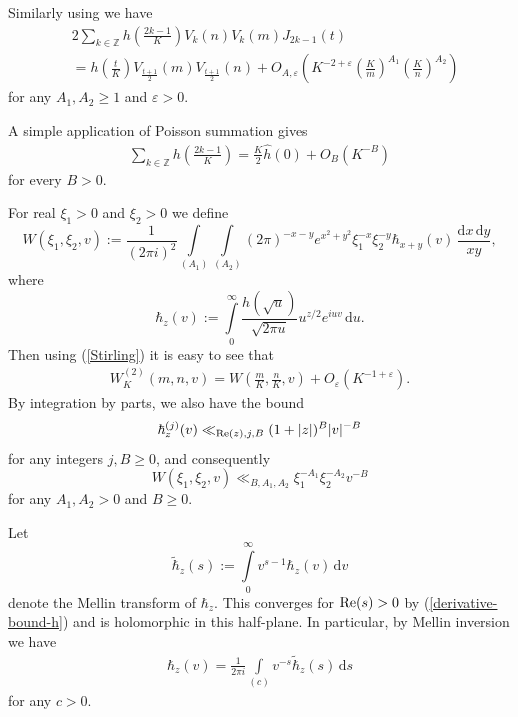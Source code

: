 \documentclass[a4paper,10pt,twoside]{amsart}
\theoremstyle{definition}
\numberwithin{equation}{section}
\newcommand\Z{\mathbb{Z}}
\newcommand\eps{\varepsilon}
\renewcommand{\Re}{\textnormal{Re}}
\renewcommand\:{\colon}
\begin{document}
Similarly using \cite[Lemma 5.8.]{Iwaniec1997} we have 
\begin{align}\label{J-Bessel-avg-III}
&2\sum_{k\in\Z} h\left(\frac{2k-1}K\right)V_k(n)V_k(m)J_{2k-1}(t) \nonumber \\
&=h\left(\frac tK\right)V_{\frac{t+1}2}(m)V_{\frac{t+1}2}(n)+O_{A,\eps}\left(K^{-2+\eps}\left(\frac Km\right)^{A_1}\left(\frac Kn\right)^{A_2}\right)
\end{align}
for any $A_1,A_2\geq 1$ and $\eps>0$.

A simple application of Poisson summation gives
\begin{align}\label{simple-Poisson}
\sum_{k\in\Z}h\left(\frac{2k-1}K\right)=\frac K2\widehat h(0)+O_B(K^{-B})
\end{align}
for every $B>0$. 

For real $\xi_1>0$ and $\xi_2>0$ we define
\[W(\xi_1,\xi_2,v):=\frac1{(2\pi i)^2}\int\limits_{(A_1)}\int\limits_{(A_2)}(2\pi )^{-x-y}e^{x^2+y^2}\xi_1^{-x}\xi_2^{-y}\hbar_{x+y}(v)\,\frac{\mathrm d x\,\mathrm d y}{xy},\]
where 
\[
\hbar_z(v):=\int\limits_0^\infty \frac{h(\sqrt u)}{\sqrt{2\pi u}}u^{z/2}e^{iuv}\,\mathrm d u. 
\]
Then using (\ref{Stirling}) it is easy to see that
\begin{align}\label{new-weight-function}
W_K^{(2)}(m,n,v)=W\left(\frac mK,\frac nK,v\right)+O_\eps\left(K^{-1+\varepsilon}\right). 
\end{align}
By integration by parts, we also have the bound
\begin{align}\label{derivative-bound-h}
\hbar_z^{(j)}(v)\ll_{\Re(z),j,B}(1+|z|)^B|v|^{-B}
\end{align}
for any integers $j,B\geq 0$, and consequently 
\[W(\xi_1,\xi_2,v)\ll_{B,A_1,A_2}\xi_1^{-A_1}\xi_2^{-A_2}v^{-B}\]
for any $A_1,A_2>0$ and $B\geq 0$. 

Let 
\[
\widetilde \hbar_z(s):=\int\limits_0^\infty v^{s-1}\hbar_z(v)\,\mathrm d v
\]
denote the Mellin transform of $\hbar_z$. This converges for $\Re(s)>0$ by (\ref{derivative-bound-h}) and is holomorphic in this half-plane. In particular, by Mellin inversion we have
\begin{align}\label{Mellin-for-h}
\hbar_z(v)=\frac1{2\pi i}\int\limits_{(c)} v^{-s}\widetilde\hbar_z(s)\,\mathrm d s 
\end{align}
for any $c>0$.
\end{document}
